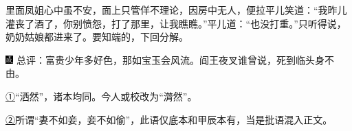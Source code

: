 里面凤姐心中虽不安，面上只管佯不理论，因房中无人，便拉平儿笑道：``我昨儿灌丧了酒了，你别愤怨，打了那里，让我瞧瞧。''平儿道：``也没打重。''只听得说，奶奶姑娘都进来了。要知端的，下回分解。

{\includegraphics[width=3mm]{../Images/00005}  \kaishu 总评：富贵少年多好色，那如宝玉会风流。阎王夜叉谁曾说，死到临头身不由。}

{\href{../Text/part0048_split_000.html\#navto_1_a}{①}``洒然''，诸本均同。今人或校改为``潸然''。}

{\href{../Text/part0048_split_000.html\#navto_2_a}{②}所谓``妻不如妾，妾不如偷''，此语仅底本和甲辰本有，当是批语混入正文。}

